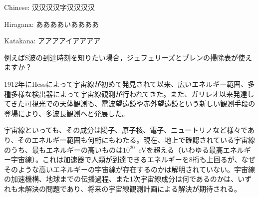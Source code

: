 \documentclass{ctexart}
\begin{document}
Chinese: 汉汉汉汉字汉汉汉汉

Hiragana: ああああいああああ

Katakana: アアアアイアアアア

例えばS波の到達時刻を知りたい場合，ジェフェリーズとブレンの掃除表が使えますか？


1912年にHessによって宇宙線が初めて発見されて以来、広いエネルギー範囲、多種多様な検出器によって宇宙線観測が行われてきた。また、ガリレオ以来発達してきた可視光での天体観測も、電波望遠鏡や赤外望遠鏡という新しい観測手段の登場により、多波長観測へと発展した。

宇宙線といっても、その成分は陽子、原子核、電子、ニュートリノなど様々であり、そのエネルギー範囲も何桁にもわたる。現在、地上で確認されている宇宙線のうち、最もエネルギーの高いものは$10^{20}$~eVを超える（いわゆる最高エネルギー宇宙線）。これは加速器で人類が到達できるエネルギーを8桁も上回るが、なぜそのような高いエネルギーの宇宙線が存在するのかは解明されていない。宇宙線の加速機構、地球までの伝播過程、また1次宇宙線成分は何であるのかは、いずれも未解決の問題であり、将来の宇宙線観測計画による解決が期待される。
\end{document}

